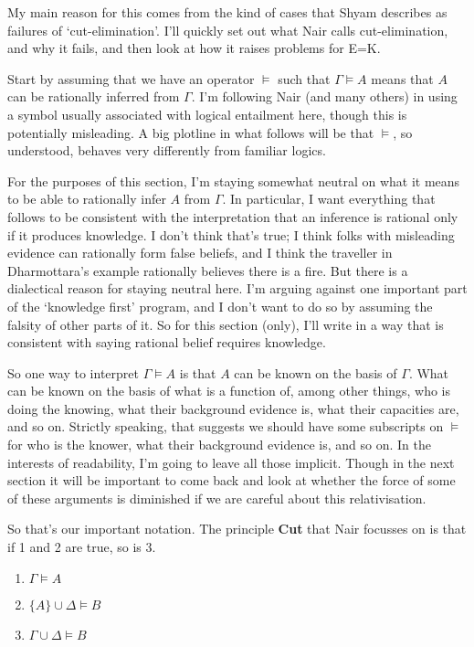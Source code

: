 \documentclass[11pt,]{book}
\providecommand{\tightlist}{%
  \setlength{\itemsep}{0pt}\setlength{\parskip}{0pt}}
\begin{document}
My main reason for this comes from the kind of cases that Shyam \citet{Nair2019} describes as failures of `cut-elimination'. I'll quickly set out what Nair calls cut-elimination, and why it fails, and then look at how it raises problems for E=K.

Start by assuming that we have an operator \(\vDash\) such that \(\Gamma \vDash A\) means that \(A\) can be rationally inferred from \(\Gamma\). I'm following Nair (and many others) in using a symbol usually associated with logical entailment here, though this is potentially misleading. A big plotline in what follows will be that \(\vDash\), so understood, behaves very differently from familiar logics.

For the purposes of this section, I'm staying somewhat neutral on what it means to be able to rationally infer \(A\) from \(\Gamma\). In particular, I want everything that follows to be consistent with the interpretation that an inference is rational only if it produces knowledge. I don't think that's true; I think folks with misleading evidence can rationally form false beliefs, and I think the traveller in Dharmottara's example rationally believes there is a fire. But there is a dialectical reason for staying neutral here. I'm arguing against one important part of the `knowledge first' program, and I don't want to do so by assuming the falsity of other parts of it. So for this section (only), I'll write in a way that is consistent with saying rational belief requires knowledge.

So one way to interpret \(\Gamma \vDash A\) is that \(A\) can be known on the basis of \(\Gamma\). What can be known on the basis of what is a function of, among other things, who is doing the knowing, what their background evidence is, what their capacities are, and so on. Strictly speaking, that suggests we should have some subscripts on \(\vDash\) for who is the knower, what their background evidence is, and so on. In the interests of readability, I'm going to leave all those implicit. Though in the next section it will be important to come back and look at whether the force of some of these arguments is diminished if we are careful about this relativisation.

So that's our important notation. The principle \textbf{Cut} that Nair focusses on is that if 1 and 2 are true, so is 3.

\begin{enumerate}
\def\labelenumi{\arabic{enumi}.}
\tightlist
\item
  \(\Gamma \vDash A\)
\item
  \(\{A\} \cup \Delta \vDash B\)
\item
  \(\Gamma \cup \Delta \vDash B\)
\end{enumerate}
\end{document}
